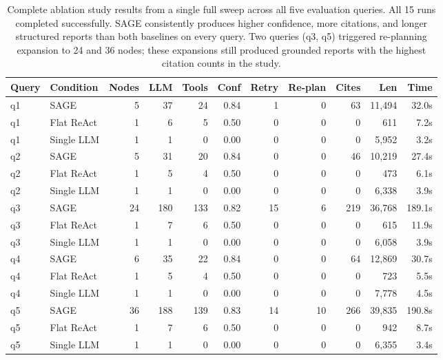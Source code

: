 \documentclass[11pt]{article}
\begin{document}
\begin{table}[H]
\centering
\caption{Complete ablation study results from a single full sweep across all five evaluation queries. All 15 runs completed successfully. SAGE consistently produces higher confidence, more citations, and longer structured reports than both baselines on every query. Two queries (q3, q5) triggered re-planning expansion to 24 and 36 nodes; these expansions still produced grounded reports with the highest citation counts in the study.}
\label{tab:ablation}
\small
\begin{tabular}{@{}llrrrrrrrrr@{}}
\toprule
\textbf{Query} & \textbf{Condition} & \textbf{Nodes} & \textbf{LLM} & \textbf{Tools} & \textbf{Conf} & \textbf{Retry} & \textbf{Re-plan} & \textbf{Cites} & \textbf{Len} & \textbf{Time} \\
\midrule
q1 & SAGE        &  5 &  37 &  24 & 0.84 &  1 &  0 &  63 & 11{,}494 &  32.0s \\
q1 & Flat ReAct  &  1 &   6 &   5 & 0.50 &  0 &  0 &   0 &     611 &   7.2s \\
q1 & Single LLM  &  1 &   1 &   0 & 0.00 &  0 &  0 &   0 &  5{,}952 &   3.2s \\
\midrule
q2 & SAGE        &  5 &  31 &  20 & 0.84 &  0 &  0 &  46 & 10{,}219 &  27.4s \\
q2 & Flat ReAct  &  1 &   5 &   4 & 0.50 &  0 &  0 &   0 &     473 &   6.1s \\
q2 & Single LLM  &  1 &   1 &   0 & 0.00 &  0 &  0 &   0 &  6{,}338 &   3.9s \\
\midrule
q3 & SAGE        & 24 & 180 & 133 & 0.82 & 15 &  6 & 219 & 36{,}768 & 189.1s \\
q3 & Flat ReAct  &  1 &   7 &   6 & 0.50 &  0 &  0 &   0 &     615 &  11.9s \\
q3 & Single LLM  &  1 &   1 &   0 & 0.00 &  0 &  0 &   0 &  6{,}058 &   3.9s \\
\midrule
q4 & SAGE        &  6 &  35 &  22 & 0.84 &  0 &  0 &  64 & 12{,}869 &  30.7s \\
q4 & Flat ReAct  &  1 &   5 &   4 & 0.50 &  0 &  0 &   0 &     723 &   5.5s \\
q4 & Single LLM  &  1 &   1 &   0 & 0.00 &  0 &  0 &   0 &  7{,}778 &   4.5s \\
\midrule
q5 & SAGE        & 36 & 188 & 139 & 0.83 & 14 & 10 & 266 & 39{,}835 & 190.8s \\
q5 & Flat ReAct  &  1 &   7 &   6 & 0.50 &  0 &  0 &   0 &     942 &   8.7s \\
q5 & Single LLM  &  1 &   1 &   0 & 0.00 &  0 &  0 &   0 &  6{,}355 &   3.4s \\
\bottomrule
\end{tabular}
\end{table}
\end{document}
